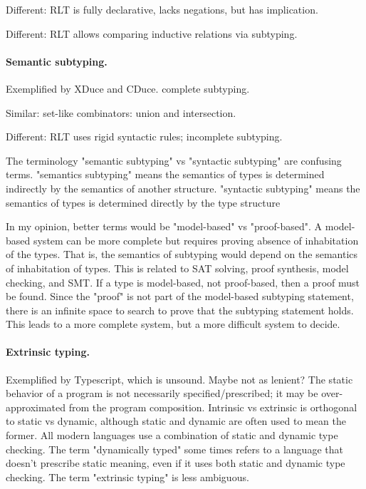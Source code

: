 \documentclass[acmsmall]{acmart}
\begin{document}
Different: RLT is fully declarative, lacks negations, but has implication. 

Different: RLT allows comparing inductive relations via subtyping. 

\paragraph{Semantic subtyping.} 
Exemplified by XDuce and CDuce. complete subtyping.

Similar: set-like combinators: union and intersection.

Different: RLT uses rigid syntactic rules; incomplete subtyping.

The terminology "semantic subtyping" vs "syntactic subtyping" are confusing terms. 
"semantics subtyping" means the semantics of types is determined indirectly by the semantics of another structure.
"syntactic subtyping" means the semantics of types is determined directly by the type structure

In my opinion, better terms would be "model-based" vs "proof-based".
A model-based system can be more complete but requires proving absence of inhabitation of the types.
That is, the semantics of subtyping would depend on the semantics of inhabitation of types.
This is related to SAT solving, proof synthesis, model checking, and SMT.
If a type is model-based, not proof-based, then a proof must be found.
Since the "proof" is not part of the model-based subtyping statement, 
there is an infinite space to search to prove that the subtyping statement holds.
This leads to a more complete system, but a more difficult system to decide.

\paragraph{Extrinsic typing.}
Exemplified by Typescript, which is unsound. Maybe not as lenient?  
The static behavior of a program is not necessarily specified/prescribed; 
it may be over-approximated from the program composition. 
Intrinsic vs extrinsic is orthogonal to static vs dynamic, although static and dynamic are often used to mean the former.
All modern languages use a combination of static and dynamic type checking.
The term "dynamically typed" some times refers to a language that doesn't prescribe static meaning,
even if it uses both static and dynamic type checking. The term "extrinsic typing" is less ambiguous.
\end{document}
